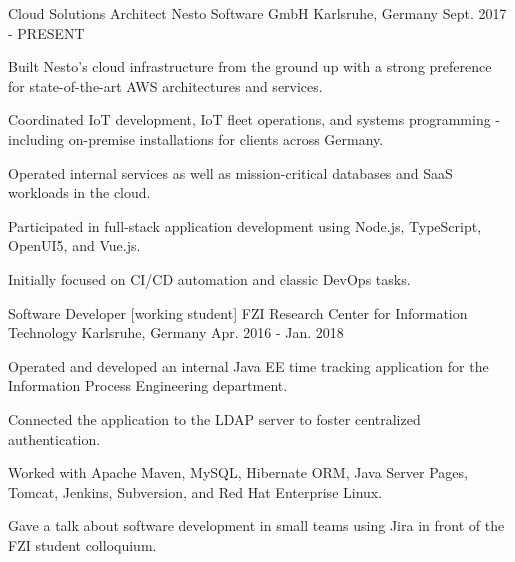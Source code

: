 

\begin{cventries}

\cventry
{Cloud Solutions Architect} %
{Nesto Software GmbH} %
{Karlsruhe, Germany} %
{Sept. 2017 - PRESENT} %
{
  \begin{cvitems} %
    \item {Built Nesto's cloud infrastructure from the ground up with a strong preference for state-of-the-art AWS architectures and services.}
    \item {Coordinated IoT development, IoT fleet operations, and systems programming - including on-premise installations for clients across Germany.}
    \item {Operated internal services as well as mission-critical databases and SaaS workloads in the cloud.}
    \item {Participated in full-stack application development using Node.js, TypeScript, OpenUI5, and Vue.js.}
    \item {Initially focused on CI/CD automation and classic DevOps tasks.}
  \end{cvitems}
}

\cventry
{Software Developer [working student]} %
{FZI Research Center for Information Technology} %
{Karlsruhe, Germany} %
{Apr. 2016 - Jan. 2018} %
{
  \begin{cvitems} %
    \item {Operated and developed an internal Java EE time tracking application for the Information Process Engineering department.}
    \item {Connected the application to the LDAP server to foster centralized authentication.}
    \item {Worked with Apache Maven, MySQL, Hibernate ORM, Java Server Pages, Tomcat, Jenkins, Subversion, and Red Hat Enterprise Linux.}
    \item {Gave a talk about software development in small teams using Jira in front of the FZI student colloquium.}
  \end{cvitems}
}


\end{cventries}
